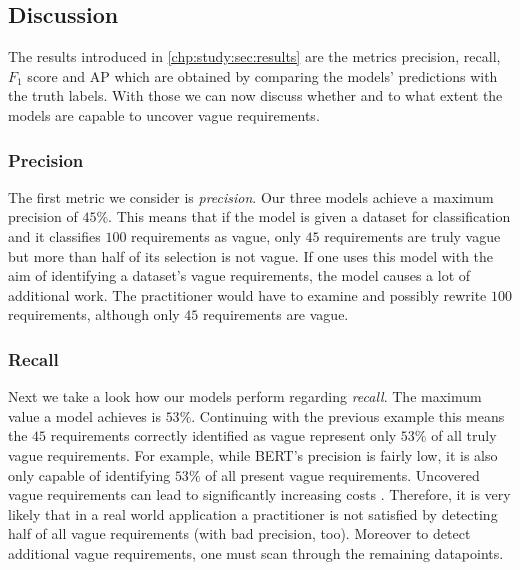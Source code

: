 \subsection{Discussion}
\label{chp:study:sec:interpretation:subsec:discussion}

The results introduced in \cref{chp:study:sec:results} are the metrics precision, recall, $F_1$ score and \ac{AP} which are obtained by comparing the models' predictions with the truth labels.
With those we can now discuss whether and to what extent the models are capable to uncover vague requirements.

\subsubsection{Precision}
\label{chp:study:sec:interpretation:subsec:discussion:precision}
The first metric we consider is \textit{precision}.
Our three models achieve a maximum precision of $45\%$.
This means that if the model is given a dataset for classification and it classifies $100$ requirements as vague, only $45$ requirements are truly vague but more than half of its selection is not vague.
If one uses this model with the aim of identifying a dataset's vague requirements, the model causes a lot of additional work.
The practitioner would have to examine and possibly rewrite $100$ requirements, although only $45$ requirements are vague.

\subsubsection{Recall}
\label{chp:study:sec:interpretation:subsec:discussion:recall}
Next we take a look how our models perform regarding \textit{recall}.
The maximum value a model achieves is $53\%$.
Continuing with the previous example this means the $45$ requirements correctly identified as vague represent only $53\%$ of all truly vague requirements.
For example, while \ac{BERT}'s precision is fairly low, it is also only capable of identifying $53\%$ of all present vague requirements.
Uncovered vague requirements can lead to significantly increasing costs \parencite{Femmer:2017}.
Therefore, it is very likely that in a real world application a practitioner is not satisfied by detecting half of all vague requirements (with bad precision, too).
Moreover to detect additional vague requirements, one must scan through the remaining datapoints.

